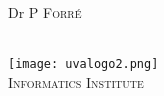 \begin{titlepage}
\begin{minipage}[t]{0.4\textwidth}
\begin{flushright}
    Dr P  \textsc{Forr\'{e}}\\
    
    \end{flushright}
    
    \end{minipage}\\[2cm]
    
    
    
    
    
    
    
    
    \texttt{[image: uvalogo2.png]}\\ %
    
    \textsc{\large Informatics Institute}\\[1.0cm] %
    
     
    
    
    
    
    \vfill %
    
    
    
    \end{titlepage}

    \restoregeometry